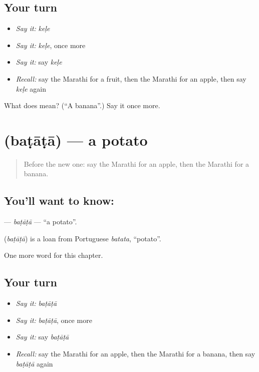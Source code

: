 \subsection*{Your turn}
\begin{itemize}
\raggedright
  \item \emph{Say it:} \emph{keḷe}
  \item \emph{Say it:} \emph{keḷe}, once more
  \item \emph{Say it:} say \emph{keḷe}
  \item \emph{Recall:} say the Marathi for a fruit, then the Marathi for an apple, then say \emph{keḷe} again
\end{itemize}

\begin{tcolorbox}[breakable,colback=teal!4,colframe=teal!35!black,title={Before you move on}]
What does  mean? (\textquotedblleft{}A banana\textquotedblright{}.) Say it once more.
\end{tcolorbox}
\section[\texorpdfstring{\mr{बटाटा} (baṭāṭā)}{बटाटा (baṭāṭā)}]{ (baṭāṭā) — a potato}

\label{lesson:MR-C86-batata}



\begin{quote}
Before the new one: say the Marathi for an apple, then the Marathi for a banana.
\end{quote}

\subsection*{You'll want to know: }
\textbf{} — \emph{baṭāṭā} — \textquotedblleft{}a potato\textquotedblright{}.

\begin{cousinweb}
\textbf{} (\emph{baṭāṭā}) is a loan from Portuguese \emph{batata}, \textquotedblleft{}potato\textquotedblright{}.
\end{cousinweb}

\begin{grammarlens}[title={What you've built}]
One more word for this chapter.
\end{grammarlens}

\subsection*{Your turn}
\begin{itemize}
\raggedright
  \item \emph{Say it:} \emph{baṭāṭā}
  \item \emph{Say it:} \emph{baṭāṭā}, once more
  \item \emph{Say it:} say \emph{baṭāṭā}
  \item \emph{Recall:} say the Marathi for an apple, then the Marathi for a banana, then say \emph{baṭāṭā} again
\end{itemize}

